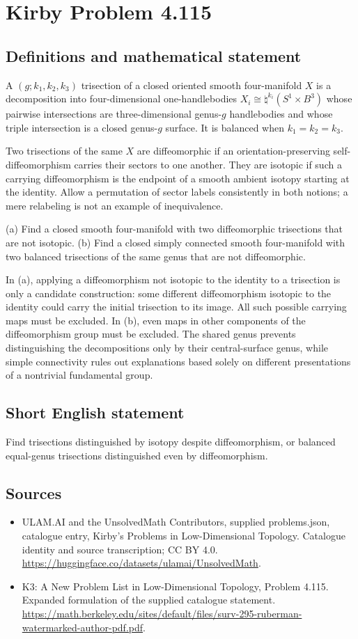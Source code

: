 \documentclass[11pt,a4paper]{article}
\begin{document}
\section*{Kirby Problem 4.115}\label{statement}

\subsection{Definitions and mathematical statement}
A $(g;k_1,k_2,k_3)$ trisection of a closed oriented smooth four-manifold $X$ is a decomposition into four-dimensional one-handlebodies $X_i\cong\natural^{k_i}(S^1\times B^3)$ whose pairwise intersections are three-dimensional genus-$g$ handlebodies and whose triple intersection is a closed genus-$g$ surface. It is balanced when $k_1=k_2=k_3$.

Two trisections of the same $X$ are diffeomorphic if an orientation-preserving self-diffeomorphism carries their sectors to one another. They are isotopic if such a carrying diffeomorphism is the endpoint of a smooth ambient isotopy starting at the identity. Allow a permutation of sector labels consistently in both notions; a mere relabeling is not an example of inequivalence.

(a) Find a closed smooth four-manifold with two diffeomorphic trisections that are not isotopic. (b) Find a closed simply connected smooth four-manifold with two balanced trisections of the same genus that are not diffeomorphic.

In (a), applying a diffeomorphism not isotopic to the identity to a trisection is only a candidate construction: some different diffeomorphism isotopic to the identity could carry the initial trisection to its image. All such possible carrying maps must be excluded. In (b), even maps in other components of the diffeomorphism group must be excluded. The shared genus prevents distinguishing the decompositions only by their central-surface genus, while simple connectivity rules out explanations based solely on different presentations of a nontrivial fundamental group.
\subsection{Short English statement}
Find trisections distinguished by isotopy despite diffeomorphism, or balanced equal-genus trisections distinguished even by diffeomorphism.
\subsection{Sources}
\begin{itemize}
\item[S1] ULAM.AI and the UnsolvedMath Contributors, supplied problems.json, catalogue entry, Kirby's Problems in Low-Dimensional Topology. Catalogue identity and source transcription; CC BY 4.0.
\url{https://huggingface.co/datasets/ulamai/UnsolvedMath}.
\item[S2] K3: A New Problem List in Low-Dimensional Topology, Problem 4.115. Expanded formulation of the supplied catalogue statement.
\url{https://math.berkeley.edu/sites/default/files/surv-295-ruberman-watermarked-author-pdf.pdf}.
\end{itemize}
\end{document}
